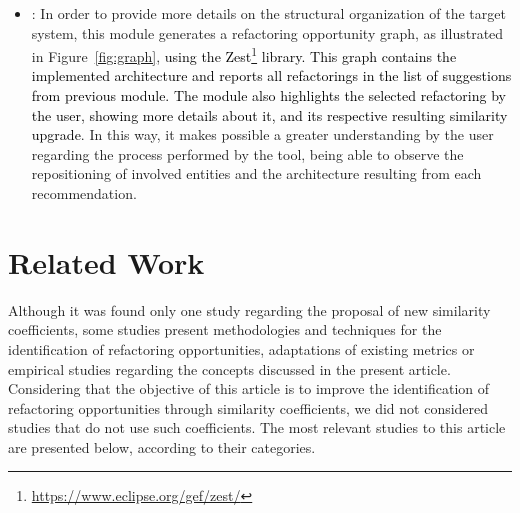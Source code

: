 \documentclass[smallextended,natbib]{svjour3}
\begin{document}
{\begin{itemize}

\item {}: In order to provide more details on the structural organization of the target system, this module generates a refactoring opportunity graph, as illustrated in Figure~\ref{fig:graph}, \textcolor{black}{using the Zest\footnote{\url{https://www.eclipse.org/gef/zest/}} library. This graph contains the implemented architecture and reports all refactorings in the list of suggestions from previous module. The module also highlights the selected refactoring by the user, showing more details about it, and its respective resulting similarity upgrade}. In this way, it makes possible a greater understanding by the user regarding the process performed by the tool, being able to observe the repositioning of involved entities and the architecture resulting from each recommendation.\\[-0.3cm]
\end{itemize}


\section{Related Work}
\label{sec:trabrela}

Although it was found only one study regarding the proposal of new similarity coefficients, some studies present methodologies and techniques for the identification of refactoring opportunities, adaptations of existing metrics or empirical studies regarding the concepts discussed in the present article. Considering that the objective of this article is to improve the identification of refactoring opportunities through similarity coefficients, we did not considered studies that do not use such coefficients. The most relevant studies to this article are presented below, according to their categories.\\[-0.2cm]

}
\end{document}
